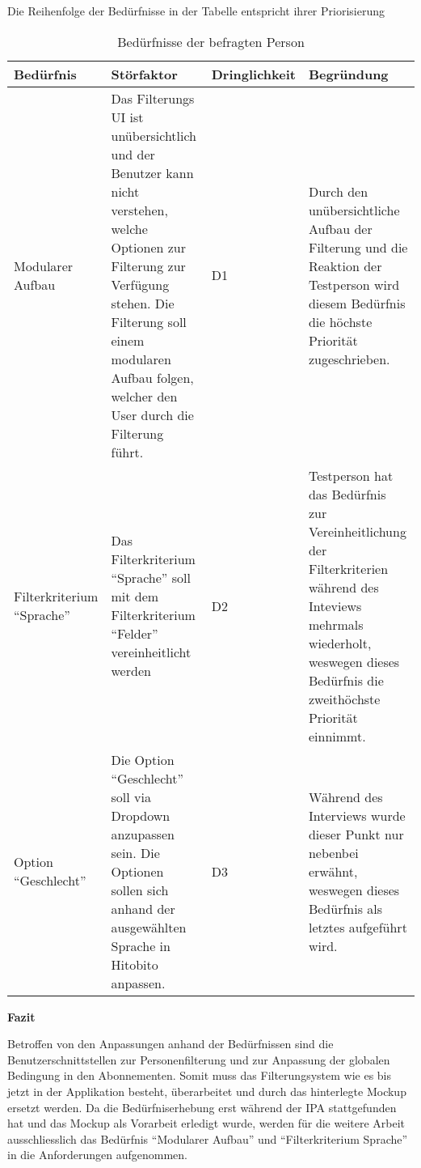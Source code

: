 Die Reihenfolge der Bedürfnisse in der Tabelle entspricht ihrer Priorisierung
\begin{table}[h!]
   \begin{tabular}{|L{0.2\textwidth}|L{0.3\textwidth}|L{0.1\textwidth}|L{0.3\textwidth}|}
       \hline
       \color{white}Bedürfnis & \color{white} Störfaktor & \color{white} Dringlichkeit & \color{white} Begründung \\
       \hline
       \label{bed1} Modularer Aufbau & Das Filterungs UI ist unübersichtlich und der Benutzer kann nicht verstehen, welche Optionen zur Filterung zur Verfügung 
       stehen. Die Filterung soll einem modularen Aufbau folgen, welcher den User durch die Filterung führt. & D1 & Durch den unübersichtliche Aufbau der Filterung und die Reaktion der Testperson wird diesem Bedürfnis die höchste Priorität zugeschrieben. \\
       \hline
       \label{bed2} Filterkriterium ``Sprache'' & Das Filterkriterium ``Sprache'' soll mit dem Filterkriterium ``Felder'' vereinheitlicht werden & D2 & Testperson hat das Bedürfnis zur Vereinheitlichung der Filterkriterien
       während des Inteviews mehrmals wiederholt, weswegen dieses Bedürfnis die zweithöchste Priorität einnimmt.  \\
       \hline
       Option ``Geschlecht'' & Die Option ``Geschlecht'' soll via Dropdown anzupassen sein. Die 
       Optionen sollen sich anhand der ausgewählten Sprache in Hitobito anpassen. & D3 & Während des Interviews wurde dieser Punkt nur nebenbei erwähnt, weswegen dieses Bedürfnis als letztes aufgeführt wird.\\
     \hline
     \end{tabular}
     \caption{Bedürfnisse der befragten Person}
\end{table}

\textbf{Fazit}

Betroffen von den Anpassungen anhand der Bedürfnissen sind die Benutzerschnittstellen zur Personenfilterung und zur Anpassung 
der globalen Bedingung in den Abonnementen. Somit muss das Filterungsystem wie es bis jetzt in der Applikation besteht, 
überarbeitet und durch das hinterlegte Mockup ersetzt werden. Da die Bedürfniserhebung erst während der IPA stattgefunden hat und das 
Mockup als Vorarbeit erledigt wurde, werden für die weitere Arbeit ausschliesslich das Bedürfnis ``Modularer Aufbau'' und 
``Filterkriterium Sprache'' in die Anforderungen aufgenommen.



